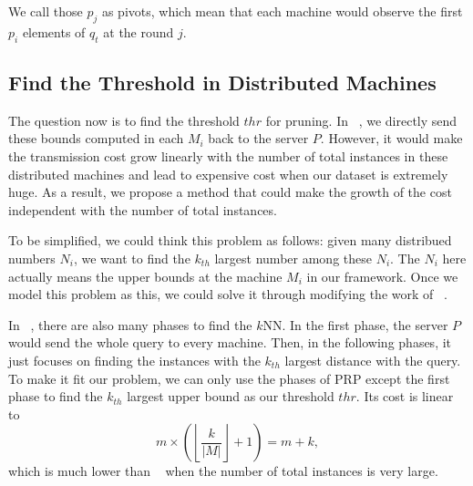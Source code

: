 We call those $p_j$ as pivots, which mean that each machine would observe the first $p_i$ elements of $q_t$ at the round $j$.  

\providecommand{\myceil}[1]{\left \lceil #1 \right \rceil }
\providecommand{\myfloor}[1]{\left \lfloor #1 \right \rfloor }

\subsection{Find the Threshold in Distributed Machines} %
\label{ss:find_the_threshold_in_distributed_machines}
The question now is to find the threshold $thr$ for pruning. In ~\cite{MsWave}, we directly send these bounds computed in each $M_i$ back to the server $P$.  However, it would make the transmission cost grow linearly with the number of total instances in these distributed machines and lead to expensive cost when our dataset is extremely huge.  As a result, we propose a method that could make the growth of the cost independent with the number of total instances.

To be simplified, we could think this problem as follows: given many distribued numbers $N_i$, we want to find the $k_{th}$ largest number among these $N_i$.  The $N_i$ here actually means the upper bounds at the machine $M_i$ in our framework.  Once we model this problem as this, we could solve it through modifying the work of ~\cite{PRP}.

In ~\cite{PRP}, there are also many phases to find the $k$NN.  In the first phase, the server $P$ would send the whole query to every machine.  Then, in the following phases, it just focuses on finding the instances with the $k_{th}$ largest distance with the query.  To make it fit our problem, we can only use the phases of PRP except the first phase to find the $k_{th}$ largest upper bound as our threshold $thr$.  Its cost is linear to
\[
m\times (\myfloor{\frac{k}{|M|}}+1)=m+k,
\] which is much lower than ~\cite{MsWave} when the number of total instances is very large.




